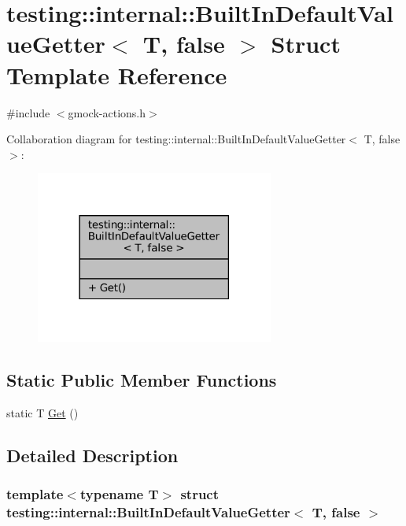 \hypertarget{structtesting_1_1internal_1_1BuiltInDefaultValueGetter_3_01T_00_01false_01_4}{}\section{testing\+:\+:internal\+:\+:Built\+In\+Default\+Value\+Getter$<$ T, false $>$ Struct Template Reference}
\label{structtesting_1_1internal_1_1BuiltInDefaultValueGetter_3_01T_00_01false_01_4}


{\ttfamily \#include $<$gmock-\/actions.\+h$>$}



Collaboration diagram for testing\+:\+:internal\+:\+:Built\+In\+Default\+Value\+Getter$<$ T, false $>$\+:
\nopagebreak
\begin{figure}[H]
\begin{center}
\leavevmode
\includegraphics[width=222pt]{structtesting_1_1internal_1_1BuiltInDefaultValueGetter_3_01T_00_01false_01_4__coll__graph}
\end{center}
\end{figure}
\subsection*{Static Public Member Functions}
\begin{DoxyCompactItemize}
\item 
static T \hyperlink{structtesting_1_1internal_1_1BuiltInDefaultValueGetter_3_01T_00_01false_01_4_a8c8e929666f61272961eea21a60de4ad}{Get} ()
\end{DoxyCompactItemize}


\subsection{Detailed Description}
\subsubsection*{template$<$typename T$>$\newline
struct testing\+::internal\+::\+Built\+In\+Default\+Value\+Getter$<$ T, false $>$}



